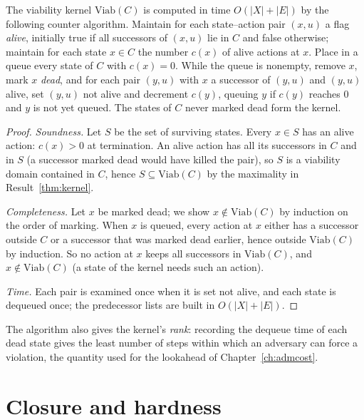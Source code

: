\begin{newresult}\label{c:kernel}
The viability kernel $\mathrm{Viab}(C)$ is computed in time $O(|X|+|E|)$ by the following counter algorithm. Maintain for each state--action pair $(x,u)$ a flag \emph{alive}, initially true if all successors of $(x,u)$ lie in $C$ and false otherwise; maintain for each state $x\in C$ the number $c(x)$ of alive actions at $x$. Place in a queue every state of $C$ with $c(x)=0$. While the queue is nonempty, remove $x$, mark $x$ \emph{dead}, and for each pair $(y,u)$ with $x$ a successor of $(y,u)$ and $(y,u)$ alive, set $(y,u)$ not alive and decrement $c(y)$, queuing $y$ if $c(y)$ reaches $0$ and $y$ is not yet queued. The states of $C$ never marked dead form the kernel.
\end{newresult}
\begin{proof}
\emph{Soundness.} Let $S$ be the set of surviving states. Every $x\in S$ has an alive action: $c(x)>0$ at termination. An alive action has all its successors in $C$ and in $S$ (a successor marked dead would have killed the pair), so $S$ is a viability domain contained in $C$, hence $S\subseteq\mathrm{Viab}(C)$ by the maximality in Result~\ref{thm:kernel}.

\emph{Completeness.} Let $x$ be marked dead; we show $x\notin\mathrm{Viab}(C)$ by induction on the order of marking. When $x$ is queued, every action at $x$ either has a successor outside $C$ or a successor that was marked dead earlier, hence outside $\mathrm{Viab}(C)$ by induction. So no action at $x$ keeps all successors in $\mathrm{Viab}(C)$, and $x\notin\mathrm{Viab}(C)$ (a state of the kernel needs such an action).

\emph{Time.} Each pair is examined once when it is set not alive, and each state is dequeued once; the predecessor lists are built in $O(|X|+|E|)$.
\end{proof}

The algorithm also gives the kernel's \emph{rank}: recording the dequeue time of each dead state gives the least number of steps within which an adversary can force a violation, the quantity used for the lookahead of Chapter~\ref{ch:admcost}.

\section{Closure and hardness}

